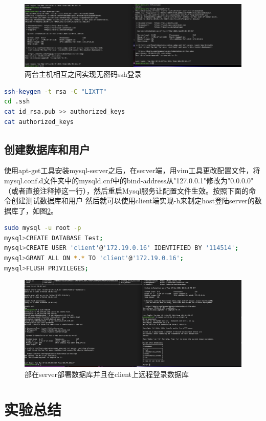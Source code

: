 \documentclass{article}
\begin{document}
\begin{figure}
    \centering
    \includegraphics[width=1.0\textwidth]{no_pwd_login.png}
    \caption{两台主机相互之间实现无密码ssh登录}
    \label{fig:3}
\end{figure}
\begin{lstlisting}[language=bash]
ssh-keygen -t rsa -C "LIXTT"
cd .ssh
cat id_rsa.pub >> authorized_keys
cat authorized_keys
\end{lstlisting}

\subsection{创建数据库和用户}

使用apt-get工具安装mysql-server之后，在server端，用vim工具更改配置文件，将mysql.conf.d文件夹中的mysqld.cnf中的bind-address从"127.0.0.1"修改为"0.0.0.0"
（或者直接注释掉这一行），然后重启Mysql服务让配置文件生效。按照下面的命令创建测试数据库和用户
然后就可以使用client端实现-h来制定host登陆server的数据库了，如图\ref{fig:4}。
\begin{lstlisting}[language=bash]
sudo mysql -u root -p
mysql>CREATE DATABASE Test;
mysql>CREATE USER 'client'@'172.19.0.16' IDENTIFIED BY '114514';
mysql>GRANT ALL ON *.* TO 'client'@'172.19.0.16';
mysql>FLUSH PRIVILEGES;
\end{lstlisting}
\begin{figure}[H]
    \centering
    \includegraphics[width=1.0\textwidth]{deploy_mysql.png}
    \caption{部在server部署数据库并且在client上远程登录数据库}
    \label{fig:4}
\end{figure}
\section{实验总结}
\indent 
\end{document}
